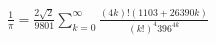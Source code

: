 \documentclass[preview]{standalone}
\begin{document}
\begin{align*}
\frac{1}{\pi} =  \frac{2\sqrt{2}}{9801} \sum_{k=0}^{\infty} \frac{(4k)!(1103+26390k)}{(k!)^4 396^{4k}}
\end{align*}
\end{document}

